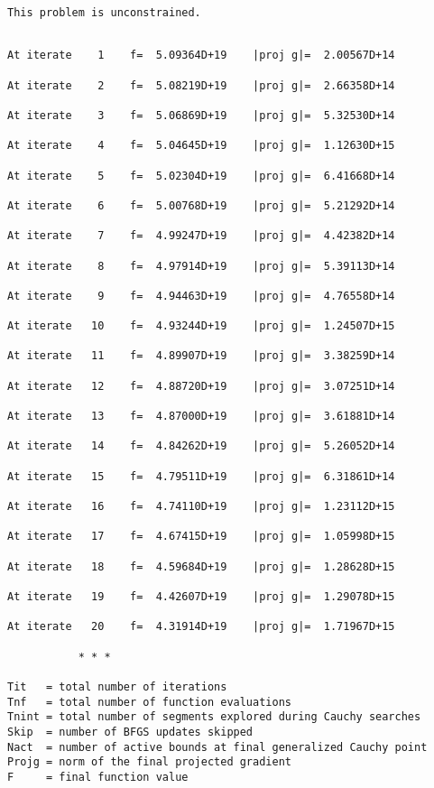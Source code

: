 \documentclass[11pt]{article}
\begin{document}
    \begin{Verbatim}[commandchars=\\\{\}]
 This problem is unconstrained.
    \end{Verbatim}

    \begin{Verbatim}[commandchars=\\\{\}]

At iterate    1    f=  5.09364D+19    |proj g|=  2.00567D+14

At iterate    2    f=  5.08219D+19    |proj g|=  2.66358D+14

At iterate    3    f=  5.06869D+19    |proj g|=  5.32530D+14

At iterate    4    f=  5.04645D+19    |proj g|=  1.12630D+15

At iterate    5    f=  5.02304D+19    |proj g|=  6.41668D+14

At iterate    6    f=  5.00768D+19    |proj g|=  5.21292D+14

At iterate    7    f=  4.99247D+19    |proj g|=  4.42382D+14

At iterate    8    f=  4.97914D+19    |proj g|=  5.39113D+14

At iterate    9    f=  4.94463D+19    |proj g|=  4.76558D+14

At iterate   10    f=  4.93244D+19    |proj g|=  1.24507D+15

At iterate   11    f=  4.89907D+19    |proj g|=  3.38259D+14

At iterate   12    f=  4.88720D+19    |proj g|=  3.07251D+14

At iterate   13    f=  4.87000D+19    |proj g|=  3.61881D+14

At iterate   14    f=  4.84262D+19    |proj g|=  5.26052D+14

At iterate   15    f=  4.79511D+19    |proj g|=  6.31861D+14

At iterate   16    f=  4.74110D+19    |proj g|=  1.23112D+15

At iterate   17    f=  4.67415D+19    |proj g|=  1.05998D+15

At iterate   18    f=  4.59684D+19    |proj g|=  1.28628D+15

At iterate   19    f=  4.42607D+19    |proj g|=  1.29078D+15

At iterate   20    f=  4.31914D+19    |proj g|=  1.71967D+15

           * * *

Tit   = total number of iterations
Tnf   = total number of function evaluations
Tnint = total number of segments explored during Cauchy searches
Skip  = number of BFGS updates skipped
Nact  = number of active bounds at final generalized Cauchy point
Projg = norm of the final projected gradient
F     = final function value


\end{Verbatim}
\end{document}
